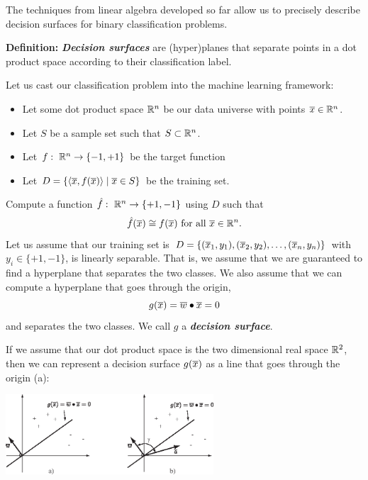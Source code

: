 \documentclass[a4paper,blends,pdf,colorBG,slideColor]{prosper}
\begin{document}
The techniques from linear algebra developed so far allow us to precisely describe decision
surfaces for binary classification problems.

{\bf Definition:} {\bf\em Decision surfaces} are (hyper)planes that separate points in a dot product space
according to their classification label.
\es


Let us cast our classification problem into the machine learning framework:
\begin{itemize}
\item Let some dot product space $\mathbb{R}^{n}$ be our data universe with points $\overline{x} \in \mathbb{R}^{n}$.
\item Let $S$ be a sample set such that $S \subset \mathbb{R}^{n}$.
\item Let $f\,\colon\; \mathbb{R}^{n} \rightarrow \{-1,+1\}$ be the target function
\item Let $D = \{\langle \overline{x}, f(\overline{x})\rangle \mid \overline{x} \in S\}$
be the training set.
\end{itemize}
Compute a function $\hat{f}\,\colon\; \mathbb{R}^{n} \rightarrow \{+1,-1\}$ using $D$ such that
\[
\hat{f}(\overline{x}) \cong f(\overline{x}) \mbox{ for all } \overline{x} \in \mathbb{R}^{n}.
\]
Let us assume that our training set is $D = \{( {\overline{x}_1}, {y_1} ),( {\overline{x}_2}, {y_2} ),\ldots,( {\overline{x}_n}, {y_n} )\}$ with $y_i \in \{+1, -1\}$, is linearly separable. That is, we assume that 
 we are guaranteed to find a hyperplane that
separates the two classes.
We also assume that we can compute a hyperplane that goes through the origin, 
\[
g(\overline{x}) = \overline{w}\bullet\overline{x}=0
\]
and separates the two classes.  We call $g$ a {\bf\em decision surface}.
\es

If we assume that our dot product space is the two dimensional real space $\mathbb{R}^{2}$,
then we can represent a decision surface $g(\overline{x})$ as a line  that goes through the origin (a):

\begin{center}
\includegraphics[height=30mm]{figures/fig04-01.eps}
\end{center}
\end{document}
